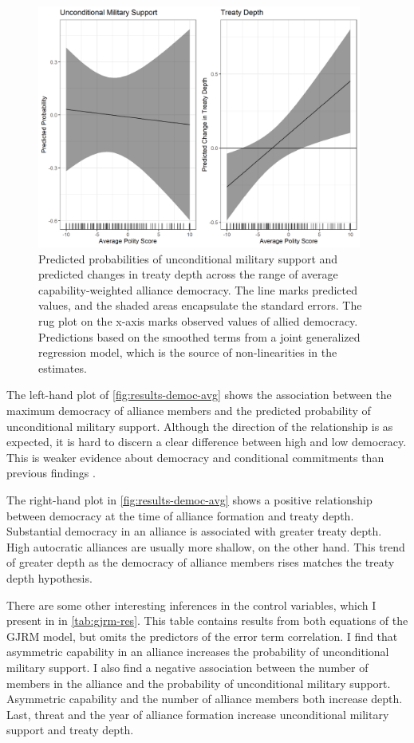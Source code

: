 \documentclass[12pt]{article}
\begin{document}
\begin{figure}[hbtp]
\centering
\includegraphics[width=0.95\textwidth]{../figures/results-democ-avg.png}
\caption{Predicted probabilities of unconditional military support and predicted changes in treaty depth across the range of average capability-weighted alliance democracy. The line marks predicted values, and the shaded areas encapsulate the standard errors. The rug plot on the x-axis marks observed values of allied democracy. Predictions based on the smoothed terms from a joint generalized regression model, which is the source of non-linearities in the estimates.}
\label{fig:results-democ-avg}
\end{figure}


The left-hand plot of \autoref{fig:results-democ-avg} shows the association between the maximum democracy of alliance members and the predicted probability of unconditional military support. 
Although the direction of the relationship is as expected, it is hard to discern a clear difference between high and low democracy. 
This is weaker evidence about democracy and conditional commitments than previous findings \citep{Mattes2012, Chibaetal2015}.


The right-hand plot in \autoref{fig:results-democ-avg} shows a positive relationship between democracy at the time of alliance formation and treaty depth. 
Substantial democracy in an alliance is associated with greater treaty depth. 
High autocratic alliances are usually more shallow, on the other hand. 
This trend of greater depth as the democracy of alliance members rises matches the treaty depth hypothesis. 


There are some other interesting inferences in the control variables, which I present in in \autoref{tab:gjrm-res}. 
This table contains results from both equations of the GJRM model, but omits the predictors of the error term correlation. 
I find that asymmetric capability in an alliance increases the probability of unconditional military support. 
I also find a negative association between the number of members in the alliance and the probability of unconditional military support. 
Asymmetric capability and the number of alliance members both increase depth. 
Last, threat and the year of alliance formation increase unconditional military support and treaty depth. 
\end{document}
